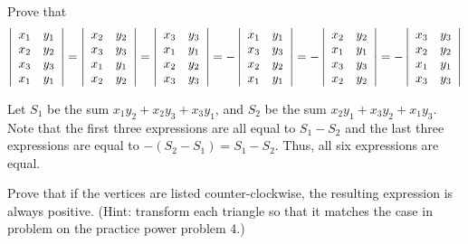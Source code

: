 \documentclass[11pt]{article}
\begin{document}
\begin{problem}  Prove that
\[\left|\begin{array}{c c} x_1 &  y_1 \\ x_2  & y_2 \\ x_3  & y_3 \\ x_1 & y_1 \\ \end{array}\right| = 
\left|\begin{array}{c c} x_2  & y_2 \\ x_3  & y_3 \\ x_1 &  y_1 \\ x_2 & y_2 \\ \end{array}\right| = 
\left|\begin{array}{c c} x_3  & y_3 \\ x_1 &  y_1 \\ x_2  & y_2 \\ x_3 & y_3 \\ \end{array}\right| = 
-\left|\begin{array}{c c}x_1 &  y_1 \\ x_3  & y_3 \\ x_2  & y_2 \\ x_1 & y_1 \\ \end{array}\right| = 
-\left|\begin{array}{c c} x_2  & y_2 \\ x_1  & y_1 \\ x_3 &  y_3 \\ x_2 & y_2 \\ \end{array}\right| = 
-\left|\begin{array}{c c} x_3  & y_3 \\ x_2 &  y_2 \\ x_1  & y_1 \\ x_3 & y_3 \\ \end{array}\right|\]
\end{problem}

\begin{solution}
Let $S_1$ be the sum $x_1y_2 + x_2y_3 + x_3y_1$, and $S_2$ be the sum $x_2y_1 + x_3y_2 + x_1y_3$.
Note that the first three expressions are all equal to $S_1-S_2$ and the last three expressions are equal to $-(S_2-S_1) = S_1-S_2$. Thus, all six expressions are equal.
\end{solution}
\begin{problem}
Prove that if the vertices are listed counter-clockwise, the resulting expression is always positive. (Hint: transform each triangle so that it matches the case in problem on the practice power problem 4.)
\end{problem}
\end{document}
